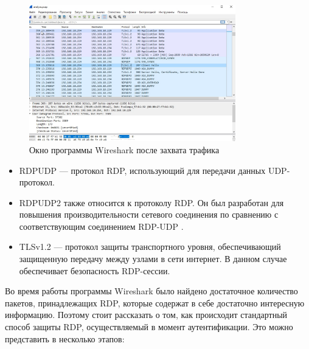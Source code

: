 \documentclass[bachelor, och, coursework]{SCWorks}
\begin{document}
  \begin{figure}[H]
    \centering
    \includegraphics[width=0.8\textwidth]{photo/wireshark1.png}
    \caption{Окно программы Wireshark после захвата трафика}
    \label{wireshark1}
  \end{figure}

  \begin{itemize}
    \item RDPUDP --- протокол RDP, использующий для передачи данных UDP-протокол.
    \item RDPUDP2 также относится к протоколу RDP. Он был разработан для повышения производительности сетевого соединения по сравнению
    с соответствующим соединением RDP-UDP \cite{rdpudp}. 
    \item TLSv1.2 --- протокол защиты транспортного уровня, обеспечивающий защищенную передачу между узлами в сети интернет. В данном случае обеспечивает
    безопасность RDP-сессии.
  \end{itemize}
  
  Во время работы программы Wireshark было найдено достаточное количество пакетов, принадлежащих RDP, которые содержат в себе достаточно интересную
  информацию. Поэтому стоит рассказать о том, как происходит стандартный способ защиты RDP, осуществляемый в момент аутентификации.
  Это можно представить в несколько этапов:
\end{document}
